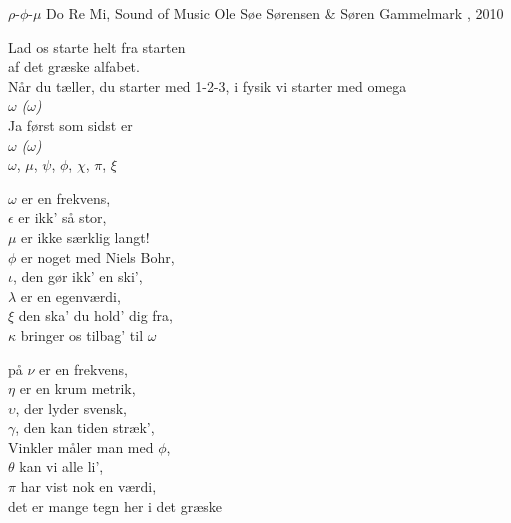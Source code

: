 \begin{song}{$\rho$-$\phi$-$\mu$}
  {} %
  {Do Re Mi, Sound of Music} %
  {Ole Søe Sørensen \& Søren Gammelmark} %
  {\TKET, 2010} %
  {\NotCCLIed} %

  \begin{SBVerse}
    Lad os starte helt fra starten\\
    af det græske alfabet.\\
    Når du tæller, du starter med 1-2-3, i fysik vi starter med omega\\
    $\omega$ \emph{($\omega$)}\\
    Ja først som sidst er\\
    $\omega$ \emph{($\omega$)}\\
    $\omega$, $\mu$, $\psi$, $\phi$, $\chi$, $\pi$, $\xi$
  \end{SBVerse}

  \begin{SBVerse}
    $\omega$ er en frekvens,\\
    $\epsilon$ er ikk’ så stor,\\
    $\mu$ er ikke særklig langt!\\
    $\phi$ er noget med Niels Bohr,\\
    $\iota$, den gør ikk’ en ski’,\\
    $\lambda$ er en egenværdi,\\
    $\xi$ den ska’ du hold’ dig fra, \\
    $\kappa$ bringer os tilbag’ til $\omega$
  \end{SBVerse}

  \begin{SBVerse}
    på $\nu$ er en frekvens,\\
    $\eta$ er en krum metrik,\\
    $\upsilon$, der lyder svensk,\\
    $\gamma$, den kan tiden stræk’,\\
    Vinkler måler man med $\phi$,\\
    $\theta$ kan vi alle li’,\\
    $\pi$ har vist nok en værdi,\\
    det er mange tegn her i det græske
  \end{SBVerse}


\end{song}
